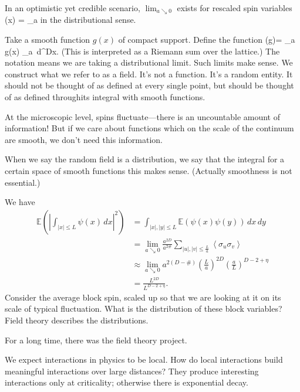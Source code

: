 In an optimistic yet credible scenario, $\lim_{a\searrow 0}$ exists for rescaled spin variables
\be
\psi(x) =  \sigma_{a\left\lfloor{}\right\rfloor}
\ee
in the distributional sense.

Take a smooth function $g(x)$ of compact support. Define the function 
\be\Psi(g)= \lim_{a} \int g(x) \sigma_{a\left\lfloor{}\right\rfloor} \,d^Dx.
\ee
%
(This is interpreted as a Riemann sum over the lattice.)
The notation means we are taking a distributional limit.
Such limits make sense. We construct what we refer to as a field. It's not a function. It's a random entity. It should not be thought of as defined at every single point, but should be thought of as defined throughits integral with smooth functions.

At the microscopic level, spins fluctuate---there is an uncountable amount of information! But if we care about functions which on the scale of the continuum are smooth, we don't need this information. 

When we say the random field is a distribution, we say that the integral for a certain space of smooth functions this makes sense. (Actually smoothness is not essential.)

We have
\begin{align}
\mathbb{E}\left( {\left| {\int_{|x|\le L} \psi(x)\,dx} \right|^2} \right)
& = \int_{|x|,|y|\le L}
\mathbb{E}(\psi(x)\psi(y))\,dx\,dy \\
&= \lim_{a \searrow 0}\frac{a^{2D}}{a^{2\#}} \sum_{|u|,|v|\le \frac{L}{a} }\left\langle {\sigma_u\sigma_v}\right\rangle\\
&\approx \lim_{a\searrow 0} a^{2(D-\#)}\left( {\frac{L}{a}} \right)^{2D} \left( {\frac{a}{L}} \right)^{D-2+\eta}\\
& = \frac{L^{2D}}{L^{D-2+\eta}}.
%
\end{align}
Consider the average block spin, scaled up so that we are looking at it on its scale of typical fluctuation. What is the distribution of these block variables? Field theory describes the distributions.

For a long time, there was the field theory project.

We expect interactions in physics to be local. How do local interactions build meaningful interactions over large distances? They produce interesting interactions only at criticality; otherwise there is exponential decay. 

